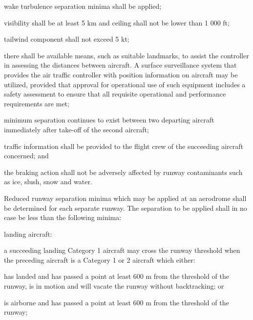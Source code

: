 \begin{enumnoss}
    \begin{enumalph}
        \item wake turbulence separation minima shall be applied;
        \item visibility shall be at least 5 km and ceiling shall not be lower than 1 000 ft;
        \item tailwind component shall not exceed 5 kt;
        \item there shall be available means, such as suitable landmarks, to assist the controller in assessing the distances between aircraft. A surface surveillance system that provides the air traffic controller with position information on aircraft may be utilized, provided that approval for operational use of such equipment includes a safety assessment to ensure that all requisite operational and performance requirements are met;
        \item minimum separation continues to exist between two departing aircraft immediately after take-off of the second aircraft;
        \item traffic information shall be provided to the flight crew of the succeeding aircraft concerned; and
        \item the braking action shall not be adversely affected by runway contaminants such as ice, slush, snow and water.
    \end{enumalph}

    \item Reduced runway separation minima which may be applied at an aerodrome shall be determined for each separate runway. The separation to be applied shall in no case be less than the following minima:

    \begin{enumalph}
        \item landing aircraft:
        \begin{enumarab}
            \item a succeeding landing Category 1 aircraft may cross the runway threshold when the preceding aircraft is a Category 1 or 2 aircraft which either:

            \begin{enumroman}
                \item has landed and has passed a point at least 600 m from the threshold of the runway, is in motion and will vacate the runway without backtracking; or
                \item is airborne and has passed a point at least 600 m from the threshold of the runway;
            \end{enumroman}


\end{enumarab}
\end{enumalph}
\end{enumnoss}
